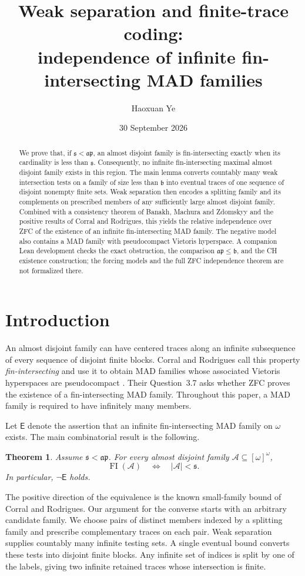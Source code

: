 \documentclass[11pt,letterpaper]{article}
\title{Weak separation and finite-trace coding:\\ independence of infinite fin-intersecting MAD families}
\author{Haoxuan Ye}
\date{30 September 2026}
\newtheorem{theorem}{Theorem}[section]
\theoremstyle{definition}
\theoremstyle{remark}
\newcommand{\s}{\mathfrak{s}}
\newcommand{\bnum}{\mathfrak{b}}
\newcommand{\ap}{\mathfrak{ap}}
\newcommand{\A}{\mathcal{A}}
\newcommand{\FI}{\operatorname{FI}}
\newcommand{\E}{\mathsf{E}}
\begin{document}
\maketitle
\begin{abstract}
We prove that, if $\s<\ap$, an almost disjoint family is fin-intersecting
exactly when its cardinality is less than $\s$. Consequently, no infinite
fin-intersecting maximal almost disjoint family exists in this region.
The main lemma converts countably many weak intersection tests on a family
of size less than $\bnum$ into eventual traces of one sequence of disjoint
nonempty finite sets. Weak separation then encodes a splitting family and
its complements on prescribed members of any sufficiently large almost
disjoint family. Combined with a consistency theorem of Banakh, Machura
and Zdomskyy and the positive results of Corral and Rodrigues, this yields
the relative independence over ZFC of the existence of an infinite
fin-intersecting MAD family. The negative model also contains a MAD family
with pseudocompact Vietoris hyperspace. A companion Lean development
checks the exact obstruction, the comparison $\ap\leq\bnum$, and the CH
existence construction; the forcing models and the full ZFC independence theorem
are not formalized there.
\end{abstract}

\section{Introduction}
An almost disjoint family can have centered traces along an infinite
subsequence of every sequence of disjoint finite blocks. Corral and
Rodrigues call this property \emph{fin-intersecting} and use it to obtain
MAD families whose associated Vietoris hyperspaces are pseudocompact
\cite{CR}. Their Question~3.7 asks whether ZFC proves the existence of a
fin-intersecting MAD family. Throughout this paper, a MAD family is
required to have infinitely many members.

Let $\E$ denote the assertion that an infinite fin-intersecting MAD family
on $\omega$ exists. The main combinatorial result is the following.
\begin{theorem}\label{thm:main}
Assume $\s<\ap$. For every almost disjoint family $\A\subseteq[\omega]^\omega$,
\[
 \FI(\A)\quad\Longleftrightarrow\quad |\A|<\s.
\]
In particular, $\neg\E$ holds.
\end{theorem}

The positive direction of the equivalence is the known small-family
bound of Corral and Rodrigues. Our argument for the converse starts with
an arbitrary candidate family. We choose pairs of distinct members indexed
by a splitting family and prescribe complementary traces on each pair.
Weak separation supplies countably many infinite testing sets. A single
eventual bound converts these tests into disjoint finite blocks. Any
infinite set of indices is split by one of the labels, giving two infinite
retained traces whose intersection is finite.
\end{document}
